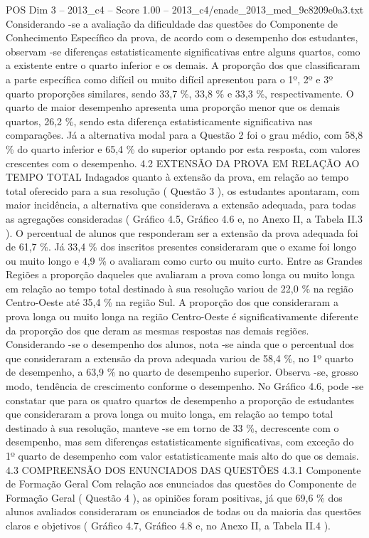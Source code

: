 \begin{textsample}{POS Dim 3 – 2013\_c4 – Score 1.00 – 2013\_c4/enade\_2013\_med\_9c8209e0a3.txt}
Considerando -se a avaliação da dificuldade das questões do Componente de Conhecimento Específico da prova, de acordo com o desempenho dos estudantes, observam -se diferenças estatisticamente significativas entre alguns quartos, como a existente entre o quarto inferior e os demais.
A proporção dos que classificaram a parte específica como difícil ou muito difícil apresentou para o 1º, 2º e 3º quarto proporções similares, sendo 33,7 \%, 33,8 \% e 33,3 \%, respectivamente.
O quarto de maior desempenho apresenta uma proporção menor que os demais quartos, 26,2 \%, sendo esta diferença estatisticamente significativa nas comparações.
Já a alternativa modal para a Questão 2 foi o grau médio, com 58,8 \% do quarto inferior e 65,4 \% do superior optando por esta resposta, com valores crescentes com o desempenho. 4.2 EXTENSÃO DA PROVA EM RELAÇÃO AO TEMPO TOTAL Indagados quanto à extensão da prova, em relação ao tempo total oferecido para a sua resolução ( Questão 3 ), os estudantes apontaram, com maior incidência, a alternativa que considerava a extensão adequada, para todas as agregações consideradas ( Gráfico 4.5, Gráfico 4.6 e, no Anexo II, a Tabela II.3 ).
O percentual de alunos que responderam ser a extensão da prova adequada foi de 61,7 \%.
Já 33,4 \% dos inscritos presentes consideraram que o exame foi longo ou muito longo e 4,9 \% o avaliaram como curto ou muito curto.
Entre as Grandes Regiões a proporção daqueles que avaliaram a prova como longa ou muito longa em relação ao tempo total destinado à sua resolução variou de 22,0 \% na região Centro-Oeste até 35,4 \% na região Sul.
A proporção dos que consideraram a prova longa ou muito longa na região Centro-Oeste é significativamente diferente da proporção dos que deram as mesmas respostas nas demais regiões.
Considerando -se o desempenho dos alunos, nota -se ainda que o percentual dos que consideraram a extensão da prova adequada variou de 58,4 \%, no 1º quarto de desempenho, a 63,9 \% no quarto de desempenho superior.
Observa -se, grosso modo, tendência de crescimento conforme o desempenho.
No Gráfico 4.6, pode -se constatar que para os quatro quartos de desempenho a proporção de estudantes que consideraram a prova longa ou muito longa, em relação ao tempo total destinado à sua resolução, manteve -se em torno de 33 \%, decrescente com o desempenho, mas sem diferenças estatisticamente significativas, com exceção do 1º quarto de desempenho com valor estatisticamente mais alto do que os demais. 4.3 COMPREENSÃO DOS ENUNCIADOS DAS QUESTÕES 4.3.1 Componente de Formação Geral Com relação aos enunciados das questões do Componente de Formação Geral ( Questão 4 ), as opiniões foram positivas, já que 69,6 \% dos alunos avaliados consideraram os enunciados de todas ou da maioria das questões claros e objetivos ( Gráfico 4.7, Gráfico 4.8 e, no Anexo II, a Tabela II.4 ).

\end{textsample}
